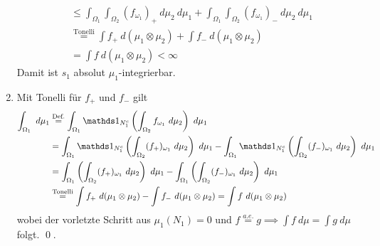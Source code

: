 \documentclass[11pt]{report}
\begin{document}
\begin{enumerate}[label=(\roman*)]
\begin{align*}
        &\leq\int_{\Omega_1}\int_{\Omega_2}(f_{\omega_1})_+\ d\mu_2\ d\mu_1+\int_{\Omega_1}\int_{\Omega_2}(f_{\omega_1})_-  \ d\mu_2\ d\mu_1\\
        &\overset{\text{Tonelli}}{=}\int f_+\ d(\mu_1\otimes\mu_2)+\int f_-\ d(\mu_1\otimes\mu_2)\\&=\int f\ d(\mu_1\otimes\mu_2)<\infty
    \end{align*}
    Damit ist $s_1$ absolut $\mu_1$-integrierbar.
    \item Mit Tonelli f\"ur $f_+$ und $f_-$ gilt
    \begin{align*}
        \int_{\Omega_1}\ d\mu_1&    \overset{\text{Def.}}{=}\int_{\Omega_1}\ind{N_1^c}\left(\int_{\Omega_2}f_{\omega_1}\ d\mu_2\right)\ d\mu_1\\
        &=\int_{\Omega_1}\ind{N_1^c}\left(\int_{\Omega_2}(f_+)_{\omega_1}\ d\mu_2\right)\ d\mu_1-\int_{\Omega_1}\ind{N_1^c}\left(\int_{\Omega_2}(f_-)_{\omega_1}\ d\mu_2\right)\ d\mu_1\\
        &=\int_{\Omega_1}\left(\int_{\Omega_2}(f_+)_{\omega_1}\ d\mu_2\right)\ d\mu_1-\int_{\Omega_1}\left(\int_{\Omega_2}(f_-)_{\omega_1}\ d\mu_2\right)\ d\mu_1\\
        &\overset{\text{Tonelli}}{=}\int f_+\ d(\mu_1\otimes\mu_2)-\int f_-\ d(\mu_1\otimes\mu_2)=\int f\ d(\mu_1\otimes\mu_2)
    \end{align*}
    wobei der vorletzte Schritt aus $\mu_1(N_1)=0$ und $f\overset{a.e.}{=}g\implies\int f\ d\mu=\int g\ d\mu$ folgt. \qed.
\end{enumerate}

\end{document}
